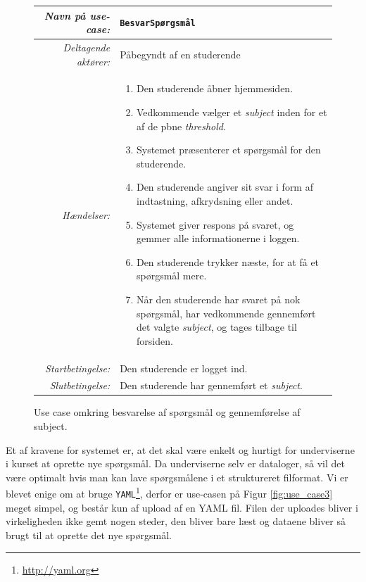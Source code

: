\documentclass[11pt, a4paper]{article}
\begin{document}
\begin{figure}[h]
    \centering
    \begin{tabular}{r p{8cm}}
        \toprule
        \textit{Navn på use-case:} & \verb!BesvarSpørgsmål! \\
        \hline
        \textit{Deltagende aktører:} & Påbegyndt af en studerende \\
        \hline
        \textit{Hændelser:} & \begin{enumerate}[nolistsep]
            \item Den studerende åbner hjemmesiden.
            \item Vedkommende vælger et \emph{subject} inden for et af de pbne \emph{threshold}.
            \item Systemet præsenterer et spørgsmål for den studerende.
            \item Den studerende angiver sit svar i form af indtastning, afkrydsning eller andet.
            \item Systemet giver respons på svaret, og gemmer alle informationerne i loggen.
            \item Den studerende trykker næste, for at få et spørgsmål mere.
            \item Når den studerende har svaret på nok spørgsmål, har vedkommende gennemført det valgte \emph{subject}, og tages tilbage til forsiden.
        \end{enumerate}  \\
        \hline
        \textit{Startbetingelse:} & Den studerende er logget ind. \\
        \hline
        \textit{Slutbetingelse:} & Den studerende har gennemført et \emph{subject}. \\
        \bottomrule
    \end{tabular}
    \caption{Use case omkring besvarelse af spørgsmål og gennemførelse af subject.}
    \label{fig:use_case2}
\end{figure}

Et af kravene for systemet er, at det skal være enkelt og hurtigt for underviserne i kurset at oprette nye spørgsmål. Da underviserne selv er dataloger, så vil det være optimalt hvis man kan lave spørgsmålene i et struktureret filformat. Vi er blevet enige om at bruge \verb!YAML!\footnote{\url{http://yaml.org}}, derfor er use-casen på Figur \ref{fig:use_case3} meget simpel, og består kun af upload af en YAML fil. Filen der uploades bliver i virkeligheden ikke gemt nogen steder, den bliver bare læst og dataene bliver så brugt til at oprette det nye spørgsmål.
\end{document}
